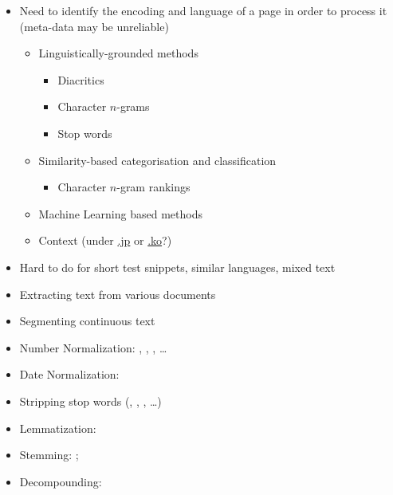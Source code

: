 \documentclass[a4paper,landscape,headrule,footrule,xetex]{foils}
\begin{document}
\begin{itemize}
\item Need to identify the encoding and language of a page in order to
  process it (meta-data may be unreliable)
  \begin{itemize}
  \item Linguistically-grounded methods
    \begin{itemize}
    \item Diacritics
    \item Character $n$-grams
    \item Stop words
    \end{itemize}
  \item Similarity-based categorisation and classification
    \begin{itemize}
    \item  Character $n$-gram rankings
    \end{itemize}
  \item Machine Learning based methods
\item Context (under \url{.jp} or \url{.ko}?)
  \end{itemize}
\item Hard to do for short test snippets, similar languages, mixed text

\end{itemize}


\begin{itemize}
\item Extracting text from various documents
\item Segmenting continuous text
\item Number Normalization:  
  , , ,  \ldots
\item Date Normalization:    
\item Stripping stop words (, , , \ldots)
\item Lemmatization:     \infers {}
\item Stemming:     \infers {};    \infers {}
\item Decompounding:   \infers {}
\end{itemize}
\end{document}
